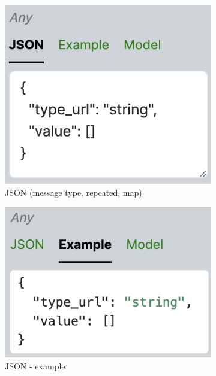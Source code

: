 \begin{figure}[!htb]
    \begin{subfigure}{.33\textwidth}
        \centering
        \includegraphics[width=.95\linewidth]{images/implementation/screenshots/input-json-field}
        \caption{JSON (message type, repeated, map)}
    \end{subfigure}
    \begin{subfigure}{.33\textwidth}
        \centering
        \includegraphics[width=.95\linewidth]{images/implementation/screenshots/input-json-example}
        \caption{JSON - example}
    \end{subfigure}%
    \begin{subfigure}{.33\textwidth}
        \centering

\end{subfigure}
\end{figure}
